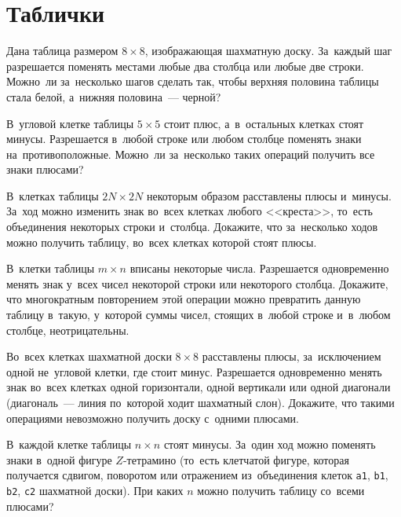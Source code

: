 
\section*{Таблички}


\begin{problems}

Дана таблица размером $8 \times 8$, изображающая шахматную доску.
За~каждый шаг разрешается поменять местами любые два столбца или любые две
строки.
Можно~ли за~несколько шагов сделать так, чтобы верхняя половина таблицы стала
белой, а~нижняя половина~--- черной?

В~угловой клетке таблицы $5 \times 5$ стоит плюс, а~в~остальных клетках стоят
минусы.
Разрешается в~любой строке или любом столбце поменять знаки на~противоположные.
Можно~ли за~несколько таких операций получить все знаки плюсами?

\item
В~клетках таблицы $2 N \times 2 N$ некоторым образом расставлены плюсы
и~минусы.
За~ход можно изменить знак во~всех клетках любого <<креста>>, то~есть
объединения некоторых строки и~столбца.
Докажите, что за~несколько ходов можно получить таблицу, во~всех клетках
которой стоят плюсы.

\item
В~клетки таблицы $m \times n$ вписаны некоторые числа.
Разрешается одновременно менять знак у~всех чисел некоторой строки или
некоторого столбца.
Докажите, что многократным повторением этой операции можно превратить данную
таблицу в~такую, у~которой суммы чисел, стоящих в~любой строке и~в~любом
столбце, неотрицательны.

\item
Во~всех клетках шахматной доски $8 \times 8$ расставлены плюсы, за~исключением
одной не~угловой клетки, где стоит минус.
Разрешается одновременно менять знак во~всех клетках одной горизонтали, одной
вертикали или одной диагонали
(диагональ~--- линия по~которой ходит шахматный слон).
Докажите, что такими операциями невозможно получить доску с~одними плюсами.

\item
В~каждой клетке таблицы $n \times n$ стоят минусы.
За~один ход можно поменять знаки в~одной фигуре $Z$-тетрамино
(то~есть клетчатой фигуре, которая получается сдвигом, поворотом или отражением
из~объединения клеток \texttt{a1}, \texttt{b1}, \texttt{b2}, \texttt{c2}
шахматной доски).
При каких $n$ можно получить таблицу со~всеми плюсами?


\end{problems}
